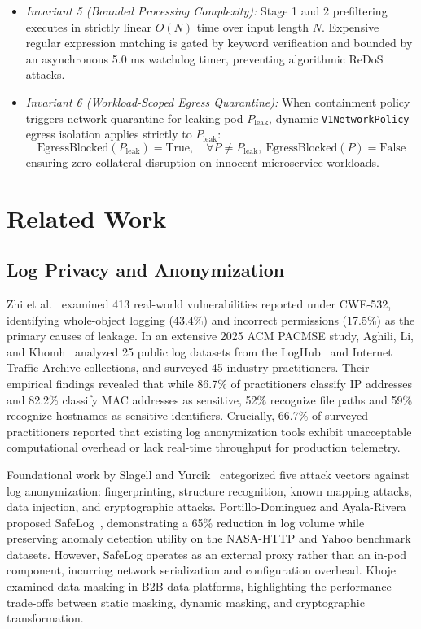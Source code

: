 \documentclass[conference]{IEEEtran}
\begin{document}
\begin{itemize}
    \item \textit{Invariant 5 (Bounded Processing Complexity):} Stage 1 and 2 prefiltering executes in strictly linear $O(N)$ time over input length $N$. Expensive regular expression matching is gated by keyword verification and bounded by an asynchronous 5.0 ms watchdog timer, preventing algorithmic ReDoS attacks.
    \item \textit{Invariant 6 (Workload-Scoped Egress Quarantine):} When containment policy triggers network quarantine for leaking pod $P_{\text{leak}}$, dynamic \texttt{V1NetworkPolicy} egress isolation applies strictly to $P_{\text{leak}}$:
    \begin{equation}
        \text{EgressBlocked}(P_{\text{leak}}) = \text{True}, \quad \forall P \neq P_{\text{leak}}, \ \text{EgressBlocked}(P) = \text{False}
    \end{equation}
    ensuring zero collateral disruption on innocent microservice workloads.
\end{itemize}


\section{Related Work}

\subsection{Log Privacy and Anonymization}
Zhi et al.~\cite{zhi2020preliminary} examined 413 real-world vulnerabilities reported under CWE-532, identifying whole-object logging (43.4\%) and incorrect permissions (17.5\%) as the primary causes of leakage. In an extensive 2025 ACM PACMSE study, Aghili, Li, and Khomh~\cite{aghili2025protecting} analyzed 25 public log datasets from the LogHub~\cite{zhu2023loghub} and Internet Traffic Archive collections, and surveyed 45 industry practitioners. Their empirical findings revealed that while 86.7\% of practitioners classify IP addresses and 82.2\% classify MAC addresses as sensitive, 52\% recognize file paths and 59\% recognize hostnames as sensitive identifiers. Crucially, 66.7\% of surveyed practitioners reported that existing log anonymization tools exhibit unacceptable computational overhead or lack real-time throughput for production telemetry.

Foundational work by Slagell and Yurcik~\cite{slagell2004sharing, slagell2006flaim} categorized five attack vectors against log anonymization: fingerprinting, structure recognition, known mapping attacks, data injection, and cryptographic attacks. Portillo-Dominguez and Ayala-Rivera proposed SafeLog~\cite{portillo2020safelog}, demonstrating a 65\% reduction in log volume while preserving anomaly detection utility on the NASA-HTTP and Yahoo benchmark datasets. However, SafeLog operates as an external proxy rather than an in-pod component, incurring network serialization and configuration overhead. Khoje~\cite{khoje2023securing} examined data masking in B2B data platforms, highlighting the performance trade-offs between static masking, dynamic masking, and cryptographic transformation.
\end{document}
